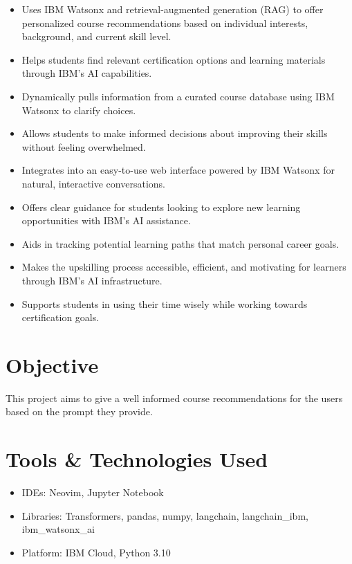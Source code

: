 \documentclass[12pt]{article}
\begin{document}
\begin{itemize}
    \item Uses IBM Watsonx and retrieval-augmented generation (RAG) to offer personalized course recommendations based on individual interests, background, and current skill level.
    \item Helps students find relevant certification options and learning materials through IBM's AI capabilities.
    \item Dynamically pulls information from a curated course database using IBM Watsonx to clarify choices.
    \item Allows students to make informed decisions about improving their skills without feeling overwhelmed.
    \item Integrates into an easy-to-use web interface powered by IBM Watsonx for natural, interactive conversations.
    \item Offers clear guidance for students looking to explore new learning opportunities with IBM's AI assistance.
    \item Aids in tracking potential learning paths that match personal career goals.
    \item Makes the upskilling process accessible, efficient, and motivating for learners through IBM's AI infrastructure.
    \item Supports students in using their time wisely while working towards certification goals.
\end{itemize}

\section{Objective}
This project aims to give a well informed course recommendations for the users based on the prompt they provide.

\section{Tools \& Technologies Used}
\begin{itemize}
  \item IDEs: Neovim, Jupyter Notebook
  \item Libraries: Transformers, pandas, numpy, langchain, langchain\_ibm, ibm\_watsonx\_ai
  \item Platform: IBM Cloud, Python 3.10
\end{itemize}

\newpage

\end{document}

